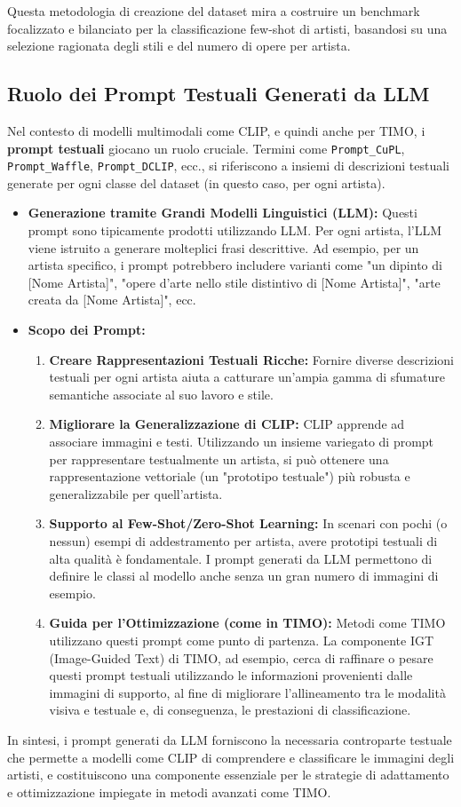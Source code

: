 \documentclass[11pt,a4paper]{article}
\begin{document}
Questa metodologia di creazione del dataset mira a costruire un benchmark focalizzato e bilanciato per la classificazione few-shot di artisti, basandosi su una selezione ragionata degli stili e del numero di opere per artista.

\subsection{Ruolo dei Prompt Testuali Generati da LLM}
Nel contesto di modelli multimodali come CLIP, e quindi anche per TIMO, i \textbf{prompt testuali} giocano un ruolo cruciale. Termini come \texttt{Prompt\_CuPL}, \texttt{Prompt\_Waffle}, \texttt{Prompt\_DCLIP}, ecc., si riferiscono a insiemi di descrizioni testuali generate per ogni classe del dataset (in questo caso, per ogni artista).
\begin{itemize}
    \item \textbf{Generazione tramite Grandi Modelli Linguistici (LLM):} Questi prompt sono tipicamente prodotti utilizzando LLM. Per ogni artista, l'LLM viene istruito a generare molteplici frasi descrittive. Ad esempio, per un artista specifico, i prompt potrebbero includere varianti come "un dipinto di [Nome Artista]", "opere d'arte nello stile distintivo di [Nome Artista]", "arte creata da [Nome Artista]", ecc.
    \item \textbf{Scopo dei Prompt:}
    \begin{enumerate}
        \item \textbf{Creare Rappresentazioni Testuali Ricche:} Fornire diverse descrizioni testuali per ogni artista aiuta a catturare un'ampia gamma di sfumature semantiche associate al suo lavoro e stile.
        \item \textbf{Migliorare la Generalizzazione di CLIP:} CLIP apprende ad associare immagini e testi. Utilizzando un insieme variegato di prompt per rappresentare testualmente un artista, si può ottenere una rappresentazione vettoriale (un "prototipo testuale") più robusta e generalizzabile per quell'artista.
        \item \textbf{Supporto al Few-Shot/Zero-Shot Learning:} In scenari con pochi (o nessun) esempi di addestramento per artista, avere prototipi testuali di alta qualità è fondamentale. I prompt generati da LLM permettono di definire le classi al modello anche senza un gran numero di immagini di esempio.
        \item \textbf{Guida per l'Ottimizzazione (come in TIMO):} Metodi come TIMO utilizzano questi prompt come punto di partenza. La componente IGT (Image-Guided Text) di TIMO, ad esempio, cerca di raffinare o pesare questi prompt testuali utilizzando le informazioni provenienti dalle immagini di supporto, al fine di migliorare l'allineamento tra le modalità visiva e testuale e, di conseguenza, le prestazioni di classificazione.
    \end{enumerate}
\end{itemize}
In sintesi, i prompt generati da LLM forniscono la necessaria controparte testuale che permette a modelli come CLIP di comprendere e classificare le immagini degli artisti, e costituiscono una componente essenziale per le strategie di adattamento e ottimizzazione impiegate in metodi avanzati come TIMO.
\end{document}
